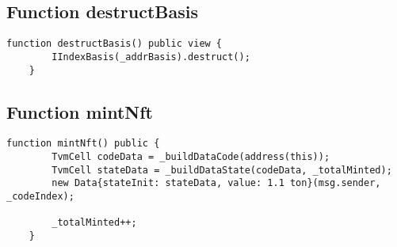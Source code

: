 \subsection{Function destructBasis}


\begin{lstlisting}[firstnumber=47]
    function destructBasis() public view {
        IIndexBasis(_addrBasis).destruct();
    }
\end{lstlisting}

\subsection{Function mintNft}




\begin{lstlisting}[firstnumber=25]
    function mintNft() public {
        TvmCell codeData = _buildDataCode(address(this));
        TvmCell stateData = _buildDataState(codeData, _totalMinted);
        new Data{stateInit: stateData, value: 1.1 ton}(msg.sender, _codeIndex);

        _totalMinted++;
    }
\end{lstlisting}

